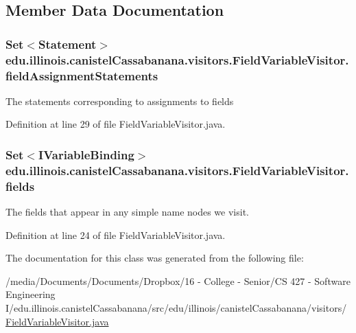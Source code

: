 \subsection{Member Data Documentation}
\hypertarget{classedu_1_1illinois_1_1canistelCassabanana_1_1visitors_1_1FieldVariableVisitor_ad5f3c20acac29bcad4c77622dca4268b}{
\subsubsection[{fieldAssignmentStatements}]{\setlength{\rightskip}{0pt plus 5cm}Set$<$Statement$>$ {\bf edu.illinois.canistelCassabanana.visitors.FieldVariableVisitor.fieldAssignmentStatements}}}
\label{classedu_1_1illinois_1_1canistelCassabanana_1_1visitors_1_1FieldVariableVisitor_ad5f3c20acac29bcad4c77622dca4268b}
The statements corresponding to assignments to fields 

Definition at line 29 of file FieldVariableVisitor.java.

\hypertarget{classedu_1_1illinois_1_1canistelCassabanana_1_1visitors_1_1FieldVariableVisitor_acaed6c0711716585d83b8b742b21ff15}{
\subsubsection[{fields}]{\setlength{\rightskip}{0pt plus 5cm}Set$<$IVariableBinding$>$ {\bf edu.illinois.canistelCassabanana.visitors.FieldVariableVisitor.fields}}}
\label{classedu_1_1illinois_1_1canistelCassabanana_1_1visitors_1_1FieldVariableVisitor_acaed6c0711716585d83b8b742b21ff15}
The fields that appear in any simple name nodes we visit. 

Definition at line 24 of file FieldVariableVisitor.java.



The documentation for this class was generated from the following file:\begin{DoxyCompactItemize}
\item 
/media/Documents/Documents/Dropbox/16 -\/ College -\/ Senior/CS 427 -\/ Software Engineering I/edu.illinois.canistelCassabanana/src/edu/illinois/canistelCassabanana/visitors/\hyperlink{FieldVariableVisitor_8java}{FieldVariableVisitor.java}\end{DoxyCompactItemize}
